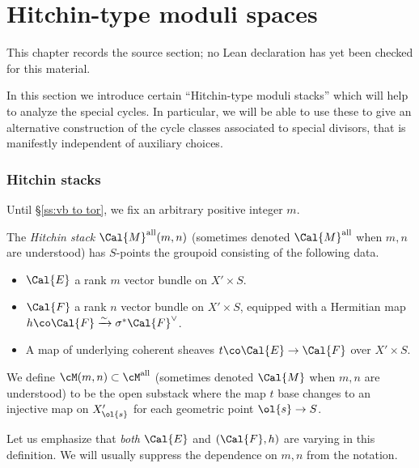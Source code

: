 \chapter{Hitchin-type moduli spaces}
\label{higher-siegel-weil-unitary-nonsingular-terms-chapter-08}

\begin{remark}
\label{higher-siegel-weil-unitary-nonsingular-terms-chapter-08-source}
This chapter records the source section; no Lean declaration has yet been checked for this material.
\notready
\end{remark}

\label{sec: hitchin spaces}

In this section we introduce certain ``Hitchin-type moduli stacks'' which will help to analyze the special cycles. In particular, we will be able to use these to give an alternative construction of the cycle classes associated to special divisors, that is manifestly independent of auxiliary choices.

\subsection{Hitchin stacks}\label{ssec: Hitchin stacks}
Until \S\ref{ss:vb to tor}, we fix an arbitrary positive integer $m$.

\begin{defn}
\notready The \emph{Hitchin stack} $\Cal{M}^{\rm all}(m,n)$ (sometimes denoted $\Cal{M}^{\rm all}$ when $m,n$ are understood) has $S$-points the groupoid consisting of the following data.
\begin{itemize}
\item $\Cal{E}$ a rank $m$ vector bundle on $X' \times S$.
\item $\Cal{F}$ a rank $n$ vector bundle on $X' \times S$, equipped with a Hermitian map $h \co \Cal{F} \xrightarrow{\sim} \sigma^* \Cal{F}^{\vee}$.
\item A map of underlying coherent sheaves $t \co \Cal{E} \rightarrow \Cal{F}$ over $X'\times S$.\end{itemize}
We define  $\cM(m,n)\subset\cM^{\rm all}$ (sometimes denoted $\Cal{M}$ when $m,n$ are understood) to be the open substack where the map $t$ base changes to an injective map on $X'_{\ol{s}}$ for each geometric point $\ol{s} \rightarrow S$.
\end{defn}
Let us emphasize that \emph{both} $\Cal{E}$ and $(\Cal{F},h)$ are varying in this definition. We will usually suppress the dependence on $m,n$ from the notation.


